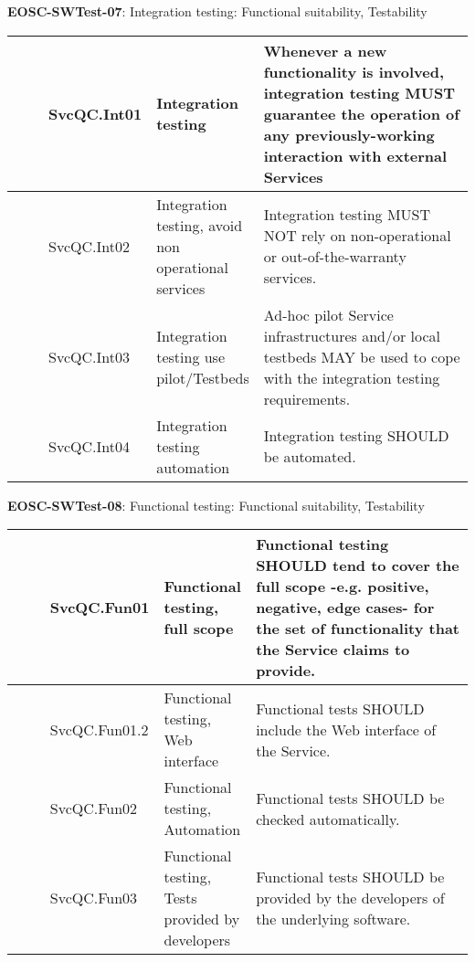 \textbf{EOSC-SWTest-07}: Integration testing: Functional suitability, Testability
\nopagebreak[4]
\begin{center}
    \tabletail{\hline}
    \tiny
    \begin{supertabular}{|p{0.10\linewidth}|p{0.10\linewidth}|p{0.20\linewidth}|p{0.60\linewidth}|} \hline
        \cite{orviz_fernandez_eosc-synergy_2020} & SvcQC.Int01 & Integration testing & Whenever a new functionality is involved, integration testing MUST guarantee the operation of any previously-working interaction with external Services\\ \hline
        \cite{orviz_fernandez_eosc-synergy_2020} & SvcQC.Int02 & Integration testing, avoid non operational services & Integration testing MUST NOT rely on non-operational or out-of-the-warranty services.\\ \hline
        \cite{orviz_fernandez_eosc-synergy_2020} & SvcQC.Int03 & Integration testing use pilot/Testbeds & Ad-hoc pilot Service infrastructures and/or local testbeds MAY be used to cope with the integration testing requirements.\\ \hline
        \cite{orviz_fernandez_eosc-synergy_2020} & SvcQC.Int04 & Integration testing automation & Integration testing SHOULD be automated.\\ \hline
    \end{supertabular}
\end{center}

\textbf{EOSC-SWTest-08}: Functional testing: Functional suitability, Testability
\nopagebreak[4]
\begin{center}
    \tabletail{\hline}
    \tiny
    \begin{supertabular}{|p{0.10\linewidth}|p{0.10\linewidth}|p{0.20\linewidth}|p{0.60\linewidth}|} \hline
        \cite{orviz_fernandez_eosc-synergy_2020} & SvcQC.Fun01 & Functional testing, full scope & Functional testing SHOULD tend to cover the full scope -e.g. positive, negative, edge cases- for the set of functionality that the Service claims to provide.\\ \hline
        \cite{orviz_fernandez_eosc-synergy_2020} & SvcQC.Fun01.2 & Functional testing, Web interface & Functional tests SHOULD include the Web interface of the Service.\\ \hline
        \cite{orviz_fernandez_eosc-synergy_2020} & SvcQC.Fun02 & Functional testing, Automation & Functional tests SHOULD be checked automatically.\\ \hline
        \cite{orviz_fernandez_eosc-synergy_2020} & SvcQC.Fun03 & Functional testing, Tests provided by developers & Functional tests SHOULD be provided by the developers of the underlying software.\\ \hline
    \end{supertabular}
\end{center}

